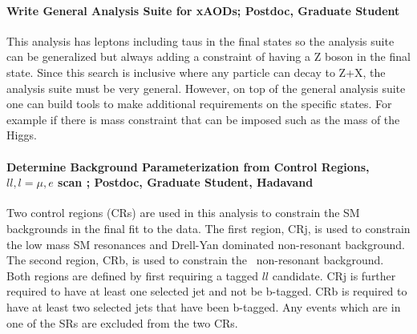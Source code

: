 \paragraph{Write General Analysis Suite for xAODs;  Postdoc, Graduate Student} %
This analysis has leptons including taus in the final states so the analysis suite can be generalized but always adding a constraint of having a Z boson in the final state. 
Since this search is inclusive where any particle can decay to Z+X, the analysis suite must be very general. 
However, on top of the general analysis suite one can build tools to make additional requirements on the specific states. For example if there is mass constraint that can be imposed such as the mass of the Higgs.

\paragraph{Determine Background Parameterization from Control Regions, $ll, l=\mu, e$ scan ;  Postdoc, Graduate Student, Hadavand}
Two control regions (CRs) are used in this analysis to constrain the SM backgrounds in the final fit to the data. The first region, CRj, is used to constrain the 
low mass SM resonances and Drell-Yan dominated non-resonant background. The second region, CRb, is used to constrain the \ttbar\ non-resonant background.
Both regions are defined by first requiring a tagged $ll$ candidate. CRj is further required to have
at least one selected jet and not be b-tagged. CRb is required to have at least two selected jets that have been b-tagged.
Any events which are in one of the SRs are excluded from the two CRs.

